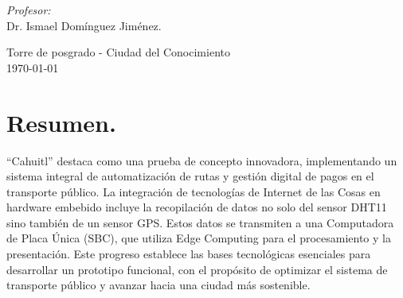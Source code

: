 \documentclass[10pt]{article}
\begin{document}
\begin{center}
\begin{minipage}{0.46\textwidth}
\begin{flushleft}
\end{flushleft}																		%
\end{minipage}		
\begin{minipage}{0.52\textwidth}		
\vspace{-0.6cm}											%
\begin{flushright} \large															%
\emph{Profesor:} \\																	%
Dr. Ismael Domínguez Jiménez.\\
\end{flushright}																	%
\end{minipage}	
\vspace*{1cm}
 	
\vspace{2cm} 																				
\begin{center}	
Torre de posgrado - Ciudad del Conocimiento \\
{\large \today}																	%
 			\end{center}												  						
\end{center}							 											
																					
\newpage																		

\tableofcontents 

\newpage

\section{Resumen.}




``Cahuitl'' destaca como una prueba de concepto innovadora, implementando un sistema integral de automatización de rutas y gestión digital de pagos en el transporte público. La integración de tecnologías de Internet de las Cosas en hardware embebido incluye la recopilación de datos no solo del sensor DHT11 sino también de un sensor GPS. Estos datos se transmiten a una Computadora de Placa Única (SBC), que utiliza Edge Computing para el procesamiento y la presentación. Este progreso establece las bases tecnológicas esenciales para desarrollar un prototipo funcional, con el propósito de optimizar el sistema de transporte público y avanzar hacia una ciudad más sostenible.
\cite{IEEEreferencias:Ref1}
\cite{IEEEreferencias:Ref2}
\end{document}
